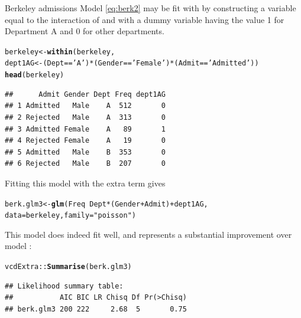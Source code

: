 \documentclass[11pt]{book}\usepackage[]{graphicx}\usepackage[]{color}
\makeatletter
\newcommand{\hlstr}[1]{\textcolor[rgb]{0.192,0.494,0.8}{#1}}%
\newcommand{\hlopt}[1]{\textcolor[rgb]{0,0,0}{#1}}%
\newcommand{\hlstd}[1]{\textcolor[rgb]{0.345,0.345,0.345}{#1}}%
\newcommand{\hlkwb}[1]{\textcolor[rgb]{0.69,0.353,0.396}{#1}}%
\newcommand{\hlkwc}[1]{\textcolor[rgb]{0.333,0.667,0.333}{#1}}%
\newcommand{\hlkwd}[1]{\textcolor[rgb]{0.737,0.353,0.396}{\textbf{#1}}}%
\newenvironment{kframe}{%
 \def\at@end@of@kframe{}%
 \ifinner\ifhmode%
  \def\at@end@of@kframe{\end{minipage}}%
  \begin{minipage}{\columnwidth}%
 \fi\fi%
 \def\FrameCommand##1{\hskip\@totalleftmargin \hskip-\fboxsep
 \colorbox{shadecolor}{##1}\hskip-\fboxsep
     \hskip-\linewidth \hskip-\@totalleftmargin \hskip\columnwidth}%
 \MakeFramed {\advance\hsize-\width
   \@totalleftmargin\z@ \linewidth\hsize
   \@setminipage}}%
 {\par\unskip\endMakeFramed%
 \at@end@of@kframe}
\newenvironment{knitrout}{}{} %
\renewenvironment{knitrout}{\small\renewcommand{\baselinestretch}{.85}}{} %
\makeatother
\begin{document}
\begin{Example}[berkeley6]{Berkeley admissions}
Model \eqref{eq:berk2} may be fit with  by constructing a variable
equal to the interaction of  and 
with a dummy variable having the value 1 for Department A and 0 for other departments.
\begin{knitrout}
\color{fgcolor}\begin{kframe}
\begin{alltt}
\hlstd{berkeley} \hlkwb{<-} \hlkwd{within}\hlstd{(berkeley,}
                   \hlstd{dept1AG} \hlkwb{<-} \hlstd{(Dept}\hlopt{==}\hlstr{'A'}\hlstd{)}\hlopt{*}\hlstd{(Gender}\hlopt{==}\hlstr{'Female'}\hlstd{)}\hlopt{*}\hlstd{(Admit}\hlopt{==}\hlstr{'Admitted'}\hlstd{))}
\hlkwd{head}\hlstd{(berkeley)}
\end{alltt}
\begin{verbatim}
##      Admit Gender Dept Freq dept1AG
## 1 Admitted   Male    A  512       0
## 2 Rejected   Male    A  313       0
## 3 Admitted Female    A   89       1
## 4 Rejected Female    A   19       0
## 5 Admitted   Male    B  353       0
## 6 Rejected   Male    B  207       0
\end{verbatim}
\end{kframe}
\end{knitrout}
Fitting this model with the extra term  gives 
\begin{knitrout}\footnotesize
{}\color{fgcolor}\begin{kframe}
\begin{alltt}
\hlstd{berk.glm3} \hlkwb{<-} \hlkwd{glm}\hlstd{(Freq} \hlopt{~} \hlstd{Dept} \hlopt{*} \hlstd{(Gender}\hlopt{+}\hlstd{Admit)} \hlopt{+} \hlstd{dept1AG,}
                 \hlkwc{data}\hlstd{=berkeley,} \hlkwc{family}\hlstd{=}\hlstr{"poisson"}\hlstd{)}
\end{alltt}
\end{kframe}
\end{knitrout}
This model does indeed fit well, and represents a substantial improvement
over model :
\begin{knitrout}
\color{fgcolor}\begin{kframe}
\begin{alltt}
\hlstd{vcdExtra::}\hlkwd{Summarise}\hlstd{(berk.glm3)}
\end{alltt}
\begin{verbatim}
## Likelihood summary table:
##           AIC BIC LR Chisq Df Pr(>Chisq)
## berk.glm3 200 222     2.68  5       0.75

\end{verbatim}
\end{kframe}
\end{knitrout}
\end{Example}
\end{document}
